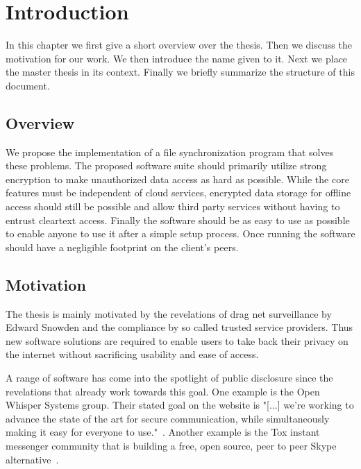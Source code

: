 \chapter{Introduction}
\label{chap:intro}

In this chapter we first give a short overview over the thesis.
Then we discuss the motivation for our work.
We then introduce the name given to it.
Next we place the master thesis in its context.
Finally we briefly summarize the structure of this document.

\section{Overview}

We propose the implementation of a file synchronization program that solves these problems.
The proposed software suite should primarily utilize strong encryption to make unauthorized data access as hard as possible.
While the core features must be independent of cloud services, encrypted data storage for offline access should still be possible and allow third party services without having to entrust cleartext access.
Finally the software should be as easy to use as possible to enable anyone to use it after a simple setup process.
Once running the software should have a negligible footprint on the client's peers.

\section{Motivation}

The thesis is mainly motivated by the revelations of drag net surveillance by Edward Snowden and the compliance by so called trusted service providers.
Thus new software solutions are required to enable users to take back their privacy on the internet without sacrificing usability and ease of access.

A range of software has come into the spotlight of public disclosure since the revelations that already work towards this goal.
One example is the Open Whisper Systems group.
Their stated goal on the website is "[...] we're working to advance the state of the art for secure communication, while simultaneously making it easy for everyone to use."~\cite{web:site:whispersystems:about}.
Another example is the Tox instant messenger community that is building a free, open source, peer to peer Skype alternative~\cite{web:site:tox}.

